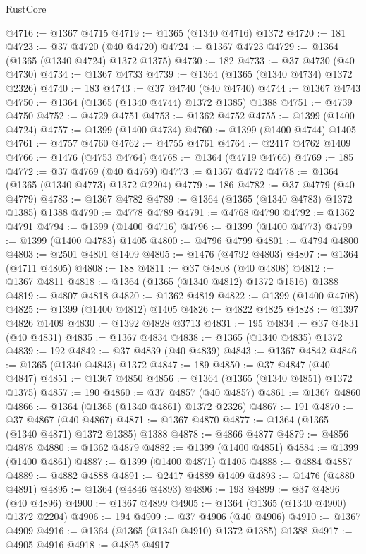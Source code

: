 \begin{lexlean}{RustCore}
\begin{coremodule}
@4716 := @1367 @4715
@4719 := @1365 (@1340 @4716) @1372
@4720 := 181
@4723 := @37 @4720 (@40 @4720)
@4724 := @1367 @4723
@4729 := @1364 (@1365 (@1340 @4724) @1372 @1375)
@4730 := 182
@4733 := @37 @4730 (@40 @4730)
@4734 := @1367 @4733
@4739 := @1364 (@1365 (@1340 @4734) @1372 @2326)
@4740 := 183
@4743 := @37 @4740 (@40 @4740)
@4744 := @1367 @4743
@4750 := @1364 (@1365 (@1340 @4744) @1372 @1385) @1388
@4751 := @4739 @4750
@4752 := @4729 @4751
@4753 := @1362 @4752
@4755 := @1399 (@1400 @4724)
@4757 := @1399 (@1400 @4734)
@4760 := @1399 (@1400 @4744) @1405
@4761 := @4757 @4760
@4762 := @4755 @4761
@4764 := @2417 @4762 @1409
@4766 := @1476 (@4753 @4764)
@4768 := @1364 (@4719 @4766)
@4769 := 185
@4772 := @37 @4769 (@40 @4769)
@4773 := @1367 @4772
@4778 := @1364 (@1365 (@1340 @4773) @1372 @2204)
@4779 := 186
@4782 := @37 @4779 (@40 @4779)
@4783 := @1367 @4782
@4789 := @1364 (@1365 (@1340 @4783) @1372 @1385) @1388
@4790 := @4778 @4789
@4791 := @4768 @4790
@4792 := @1362 @4791
@4794 := @1399 (@1400 @4716)
@4796 := @1399 (@1400 @4773)
@4799 := @1399 (@1400 @4783) @1405
@4800 := @4796 @4799
@4801 := @4794 @4800
@4803 := @2501 @4801 @1409
@4805 := @1476 (@4792 @4803)
@4807 := @1364 (@4711 @4805)
@4808 := 188
@4811 := @37 @4808 (@40 @4808)
@4812 := @1367 @4811
@4818 := @1364 (@1365 (@1340 @4812) @1372 @1516) @1388
@4819 := @4807 @4818
@4820 := @1362 @4819
@4822 := @1399 (@1400 @4708)
@4825 := @1399 (@1400 @4812) @1405
@4826 := @4822 @4825
@4828 := @1397 @4826 @1409
@4830 := @1392 @4828 @3713
@4831 := 195
@4834 := @37 @4831 (@40 @4831)
@4835 := @1367 @4834
@4838 := @1365 (@1340 @4835) @1372
@4839 := 192
@4842 := @37 @4839 (@40 @4839)
@4843 := @1367 @4842
@4846 := @1365 (@1340 @4843) @1372
@4847 := 189
@4850 := @37 @4847 (@40 @4847)
@4851 := @1367 @4850
@4856 := @1364 (@1365 (@1340 @4851) @1372 @1375)
@4857 := 190
@4860 := @37 @4857 (@40 @4857)
@4861 := @1367 @4860
@4866 := @1364 (@1365 (@1340 @4861) @1372 @2326)
@4867 := 191
@4870 := @37 @4867 (@40 @4867)
@4871 := @1367 @4870
@4877 := @1364 (@1365 (@1340 @4871) @1372 @1385) @1388
@4878 := @4866 @4877
@4879 := @4856 @4878
@4880 := @1362 @4879
@4882 := @1399 (@1400 @4851)
@4884 := @1399 (@1400 @4861)
@4887 := @1399 (@1400 @4871) @1405
@4888 := @4884 @4887
@4889 := @4882 @4888
@4891 := @2417 @4889 @1409
@4893 := @1476 (@4880 @4891)
@4895 := @1364 (@4846 @4893)
@4896 := 193
@4899 := @37 @4896 (@40 @4896)
@4900 := @1367 @4899
@4905 := @1364 (@1365 (@1340 @4900) @1372 @2204)
@4906 := 194
@4909 := @37 @4906 (@40 @4906)
@4910 := @1367 @4909
@4916 := @1364 (@1365 (@1340 @4910) @1372 @1385) @1388
@4917 := @4905 @4916
@4918 := @4895 @4917

\end{coremodule}
\end{lexlean}
